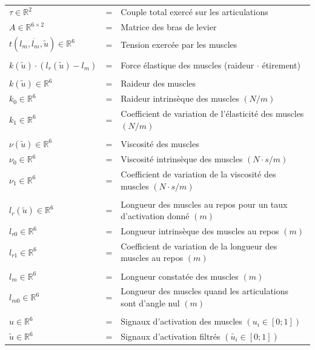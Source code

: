\documentclass[pdftex,a4paper,11pt]{article}
\numberwithin{equation}{subsection}
\begin{document}
\paragraph{}
\begin{small}
\begin{tabular}{lcl}
    $\tau \in \mathbb{R}^2$              & = & Couple total exercé sur les articulations \\
    $A \in \mathbb{R}^{6 \times 2}$      & = & Matrice des bras de levier \\
    $t(l_m, \dot{l_m}, \tilde{u}) \in \mathbb{R}^6$  & = & Tension exercée par les muscles \\
    \\
    $k(\tilde{u}) \cdot (l_r(\tilde{u}) - l_m)$ & = & Force élastique des muscles (raideur $\cdot$ étirement) \\
    \\

    $k(\tilde{u}) \in \mathbb{R}^6$      & = & Raideur des muscles \\
    $k_0 \in \mathbb{R}^6$               & = & Raideur intrinsèque des muscles $(N/m)$ \\
    $k_1 \in \mathbb{R}^6$               & = & Coefficient de variation de l'élasticité des muscles $(N/m)$ \\
    \\

    $\nu(\tilde{u}) \in \mathbb{R}^6$    & = & Viscosité des muscles \\
    $\nu_0 \in \mathbb{R}^6$             & = & Viscosité intrinsèque des muscles $(N \cdot s/m)$ \\
    $\nu_1 \in \mathbb{R}^6$             & = & Coefficient de variation de la viscosité des muscles $(N \cdot s/m)$ \\
    \\

    $l_r(\tilde{u}) \in \mathbb{R}^6$    & = & Longueur des muscles au repos pour un taux d'activation donné $(m)$ \\
    $l_{r0} \in \mathbb{R}^6$            & = & Longueur intrinsèque des muscles au repos $(m)$ \\
    $l_{r1} \in \mathbb{R}^6$            & = & Coefficient de variation de la longueur des muscles au repos $(m)$ \\
    \\

    $l_m \in \mathbb{R}^6$               & = & Longueur constatée des muscles $(m)$ \\
    $l_{m0} \in \mathbb{R}^6$            & = & Longueur des muscles quand les articulations sont d'angle nul $(m)$ \\
    \\

    $u \in \mathbb{R}^6$                 & = & Signaux d'activation des muscles $(u_i \in [0;1])$ \\
    $\tilde{u} \in \mathbb{R}^6$         & = & Signaux d'activation filtrés $(\tilde{u_i} \in [0;1])$ \\
\end{tabular}
\end{small}
\end{document}
